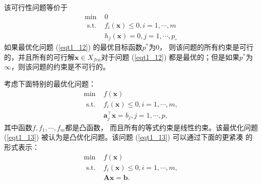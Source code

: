 该可行性问题等价于
\begin{equation}
\begin{array}{ll}
\min & 0 \\
\text { s.t. } & f_{i}(\bm{x}) \leq 0, i=1, \cdots, m \\
& h_{j}(\bm{x})=0, j=1, \cdots, p_{\circ}
\end{array}
    \label{eqt1_12}
\end{equation}
如果最优化问题 (\ref{eqt1_12}) 的最优目标函数$  p^{*}  $为$ 0 $， 则该问题的所有约束是可行的，并且所有的可行解$  \bm{x} \in X_{f e a}  $对于问题 (\ref{eqt1_12}) 都是最优的；但是如果$  p^{*}  $为$
 \infty $，则该问题的约束是不可行的。
\par 考虑下面特别的最优化问题：
\begin{equation}
\begin{array}{ll}
\min & f(\bm{x}) \\
\text { s.t. } & f_{i}(\bm{x}) \leq 0, i=1, \cdots, m, \\
& \bm{a}_{j}^{\top} \bm{x}=b_{j}, j=1, \cdots, p,
\end{array}
    \label{eqt1_13}
\end{equation}
其中函数$  f, f_{1}, \cdots, f_{m}  $都是凸函数， 而且所有的等式约束是线性约束。该最优化问题 (\ref{eqt1_13}) 被认为是凸优化问题。该问题 (\ref{eqt1_13}) 可以通过下面的更紧凑 的形式表示：
\begin{equation}
\begin{array}{ll}
\min & f(\bm{x}) \\
\text { s.t. } & f_{i}(\bm{x}) \leq 0, i=1, \cdots, m, \\
& \bm{A} \bm{x}=\bm{b} .
\end{array}
    \label{eqt1_14}
\end{equation}

